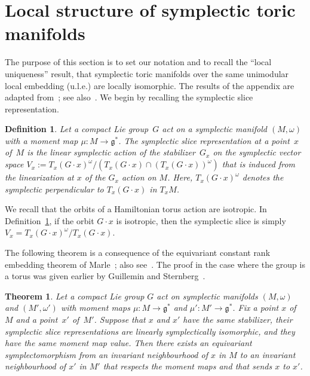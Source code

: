 \documentclass[pdftex]{sigma}
\numberwithin{equation}{section}
\newtheorem{Theorem}[Lemma]{Theorem}
\newtheorem{Definition}[Lemma]{Definition}
\begin{document}
\section{Local structure of symplectic toric manifolds}
\label{sec:background}

The purpose of this section is to set our notation
and to recall the ``local uniqueness'' result,
that symplectic toric manifolds
over the same unimodular local embedding (u.l.e.)
are locally isomorphic.  The results of the appendix
are adapted from~\cite{De}; see also~\cite{LT}.
We begin by recalling the symplectic slice representation.

\begin{Definition} \label{def:s.slice}
Let a compact Lie group~$G$ act on a symplectic manifold $(M,\omega)$
with a moment map $\mu \colon M \to {\mathfrak g}^*$.
The \emph{symplectic slice representation} at a point~$x$ of~$M$
is the linear symplectic action of the stabilizer~$G_x$
on the symplectic vector space
$V_x := T_x  (G\cdot x)^\omega /
 (T_x (G\cdot x) \cap  (T_x (G \cdot x))^\omega )$
that is induced from the linearization at $x$ of the $G_x$ action on $M$.
Here, $T_x (G\cdot x)^\omega$ denotes the symplectic perpendicular
to $T_x (G\cdot x)$ in $T_xM$.
\end{Definition}

We recall that the orbits of a Hamiltonian torus action are isotropic.
In Def\/inition~\ref{def:s.slice}, if the orbit $G \cdot x$
is isotropic, then the symplectic slice is simply
$V_x = T_x  (G\cdot x)^\omega / T_x (G\cdot x) $.

The following theorem is a consequence of the equivariant constant
rank embedding theorem of Marle~\cite{marle}; also see~\cite[Section 2]{LS}.
The proof in the case where the
group is a torus was given earlier by Guillemin and
Sternberg~\cite{GS:normal}.

\begin{Theorem}\label{thm:equiv-isotro-emb}
Let a compact Lie group $G$ act on symplectic manifolds
$(M,\omega)$ and $(M',\omega')$ with moment maps
$\mu \colon M \to {\mathfrak g}^*$ and $\mu' \colon M' \to {\mathfrak g}^*$.
Fix a point $x$ of $M$ and a point~$x'$ of~$M'$.
Suppose that $x$ and $x'$ have the same stabilizer,
their symplectic slice representations are linearly symplectically isomorphic,
and they have the same moment map value.
Then there exists an equivariant symplectomorphism
from an invariant neighbourhood of $x$ in $M$
to an invariant neighbourhood of $x'$ in $M'$
that respects the moment maps and that sends $x$ to $x'$.
\end{Theorem}
\end{document}
